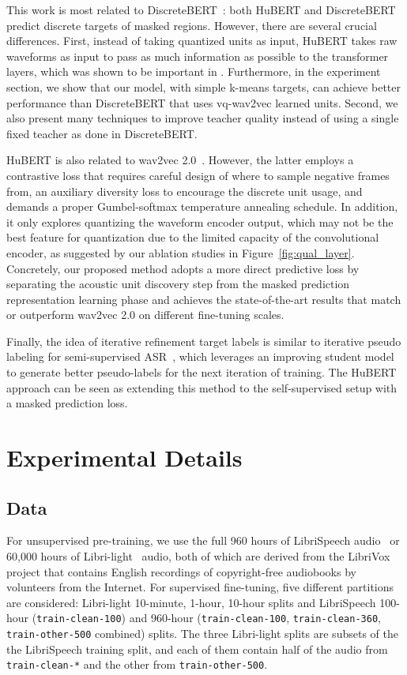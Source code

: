 This work is most related to DiscreteBERT~\cite{baevski2019effectiveness}: both HuBERT and DiscreteBERT predict discrete targets of masked regions. However, there are several crucial differences. First, instead of taking quantized units as input, HuBERT takes raw waveforms as input to pass as much information as possible to the transformer layers, which was shown to be important in \cite{baevski2020wav2vec}. Furthermore, in the experiment section, we show that our model, with simple k-means targets, can achieve better performance than DiscreteBERT that uses vq-wav2vec \cite{baevski2019vq} learned units. Second, we also present many techniques to improve teacher quality instead of using a single fixed teacher as done in DiscreteBERT.

HuBERT is also related to wav2vec 2.0~\cite{baevski2020wav2vec}. However, the latter employs a contrastive loss that requires careful design of where to sample negative frames from, an auxiliary diversity loss to encourage the discrete unit usage, and demands a proper Gumbel-softmax temperature annealing schedule. In addition, it only explores quantizing the waveform encoder output, which may not be the best feature for quantization due to the limited capacity of the convolutional encoder, as suggested by our ablation studies in Figure~\ref{fig:qual_layer}. Concretely, our proposed method adopts a more direct predictive loss by separating the acoustic unit discovery step from the masked prediction representation learning phase and achieves the state-of-the-art results that match or outperform wav2vec 2.0 on different fine-tuning scales.

Finally, the idea of iterative refinement target labels is similar to iterative pseudo labeling for semi-supervised ASR~\cite{xu2020iterative, likhomanenko2020slimipl}, which leverages an improving student model to generate better pseudo-labels for the next iteration of training. The HuBERT approach can be seen as extending this method to the self-supervised setup with a masked prediction loss.

\section{Experimental Details}

\subsection{Data}\label{sec:data}
For unsupervised pre-training, we use the full 960 hours of LibriSpeech audio~\cite{panayotov2015librispeech} or 60,000 hours of Libri-light~\cite{kahn2020libri} audio, both of which are derived from the LibriVox project that contains English recordings of copyright-free audiobooks by volunteers from the Internet. For supervised fine-tuning, five different partitions are considered: Libri-light 10-minute, 1-hour, 10-hour splits and LibriSpeech 100-hour (\texttt{train-clean-100}) and 960-hour (\texttt{train-clean-100}, \texttt{train-clean-360}, \texttt{train-other-500} combined) splits. The three Libri-light splits are subsets of the the LibriSpeech training split, and each of them contain half of the audio from \texttt{train-clean-*} and the other from \texttt{train-other-500}.

